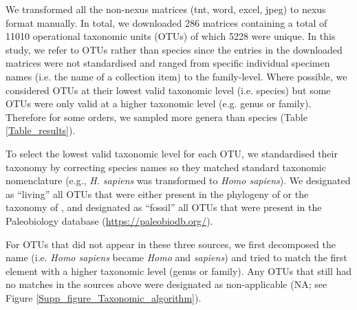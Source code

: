 We transformed all the non-nexus matrices (tnt, word, excel, jpeg) to nexus format manually.
In total, we downloaded 286 matrices containing a total of 11010 operational taxonomic units (OTUs) of which 5228 were unique.
In this study, we refer to OTUs rather than species since the entries in the downloaded matrices were not standardised and ranged from specific individual specimen names (i.e. the name of a collection item) to the family-level.
Where possible, we considered OTUs at their lowest valid taxonomic level (i.e. species) but some OTUs were only valid at a higher taxonomic level (e.g. genus or family).
Therefore for some orders, we sampled more genera than species (Table \ref{Table_results}).

To select the lowest valid taxonomic level for each OTU, we standardised their taxonomy by correcting species names so they matched standard taxonomic nomenclature (e.g., \textit{H. sapiens} was transformed to \textit{Homo sapiens}).
We designated as ``living'' all OTUs that were either present in the phylogeny of \citep{BinindaEmonds} or the taxonomy of \citep{wilson2005mammal}, and designated as ``fossil'' all OTUs that were present in the Paleobiology database (\url{https://paleobiodb.org/}).

For OTUs that did not appear in these three sources, we first decomposed the name (i.e. \textit{Homo sapiens} became \textit{Homo} and \textit{sapiens}) and tried to match the first element with a higher taxonomic level (genus or family).
Any OTUs that still had no matches in the sources above were designated as non-applicable (NA; see Figure \ref{Supp_figure_Taxonomic_algorithm}).

